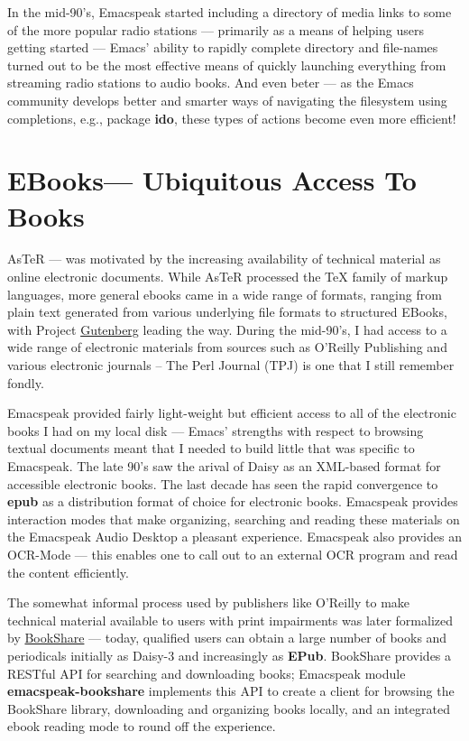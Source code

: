 \documentclass[11pt]{article}
\begin{document}
In the mid-90's, Emacspeak started including a directory of media
links to some of the more popular radio stations — primarily as a
means of helping users getting started — Emacs' ability to
rapidly complete directory and file-names turned out to be the
most effective means of quickly launching everything from
streaming radio stations to audio books. And even beter — as the
Emacs community develops better and smarter ways of navigating
the filesystem using completions, e.g., package \textbf{ido}, these
types of actions become even more efficient!

\section{EBooks—   Ubiquitous Access To Books}
\label{sec-11}


AsTeR — was motivated by the increasing availability of technical
material as online electronic documents. While AsTeR processed
the \TeX{} family of markup languages, more general ebooks came in a
wide range of formats, ranging from plain text generated from
various underlying file formats to structured EBooks, with
Project \href{http://www.gutenberg.org/}{Gutenberg} leading the way. During the mid-90's, I had
access to a wide range of electronic materials from sources such
as O'Reilly Publishing and various electronic journals -- The
Perl Journal (TPJ) is one that I still remember fondly.

Emacspeak provided fairly light-weight but efficient access to
all of the electronic books I had on my local disk — Emacs'
strengths with respect to browsing textual documents meant that I
needed to build little that was specific to Emacspeak. The late
90's saw the arival of Daisy as an XML-based format for
accessible electronic books. The last decade has seen the rapid
convergence to \textbf{epub} as a distribution format of choice for
electronic books. Emacspeak provides interaction modes that make
organizing, searching and reading these materials on the
Emacspeak Audio Desktop a pleasant experience. Emacspeak also
provides an OCR-Mode — this enables one to call out to an
external OCR program and read the content efficiently.

The somewhat informal process used by publishers like O'Reilly to
make technical material available to users with print impairments
was later formalized by \href{https://www.bookshare.org/}{BookShare} — today, qualified users can
obtain a large number of books and periodicals initially as
Daisy-3 and increasingly as \textbf{EPub}. BookShare provides a RESTful
API for searching and downloading books; Emacspeak module
\textbf{emacspeak-bookshare} implements this API to create a client for
browsing the BookShare library, downloading and organizing books
locally, and an integrated ebook reading mode to round off the
experience.
\end{document}
